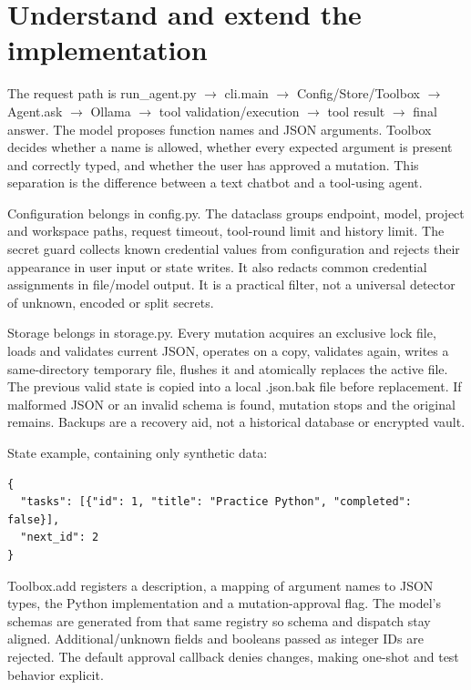 \chapter{Understand and extend the implementation}

The request path is run\_agent.py \(\rightarrow\) cli.main \(\rightarrow\) Config/Store/Toolbox \(\rightarrow\) Agent.ask \(\rightarrow\) Ollama \(\rightarrow\) tool validation/execution \(\rightarrow\) tool result \(\rightarrow\) final answer. The model proposes function names and JSON arguments. Toolbox decides whether a name is allowed, whether every expected argument is present and correctly typed, and whether the user has approved a mutation. This separation is the difference between a text chatbot and a tool-using agent.

Configuration belongs in config.py. The dataclass groups endpoint, model, project and workspace paths, request timeout, tool-round limit and history limit. The secret guard collects known credential values from configuration and rejects their appearance in user input or state writes. It also redacts common credential assignments in file/model output. It is a practical filter, not a universal detector of unknown, encoded or split secrets.

Storage belongs in storage.py. Every mutation acquires an exclusive lock file, loads and validates current JSON, operates on a copy, validates again, writes a same-directory temporary file, flushes it and atomically replaces the active file. The previous valid state is copied into a local .json.bak file before replacement. If malformed JSON or an invalid schema is found, mutation stops and the original remains. Backups are a recovery aid, not a historical database or encrypted vault.

State example, containing only synthetic data:

\begin{Verbatim}[breaklines,breakanywhere,fontsize=\small]
{
  "tasks": [{"id": 1, "title": "Practice Python", "completed": false}],
  "next_id": 2
}
\end{Verbatim}

Toolbox.add registers a description, a mapping of argument names to JSON types, the Python implementation and a mutation-approval flag. The model's schemas are generated from that same registry so schema and dispatch stay aligned. Additional/unknown fields and booleans passed as integer IDs are rejected. The default approval callback denies changes, making one-shot and test behavior explicit.

